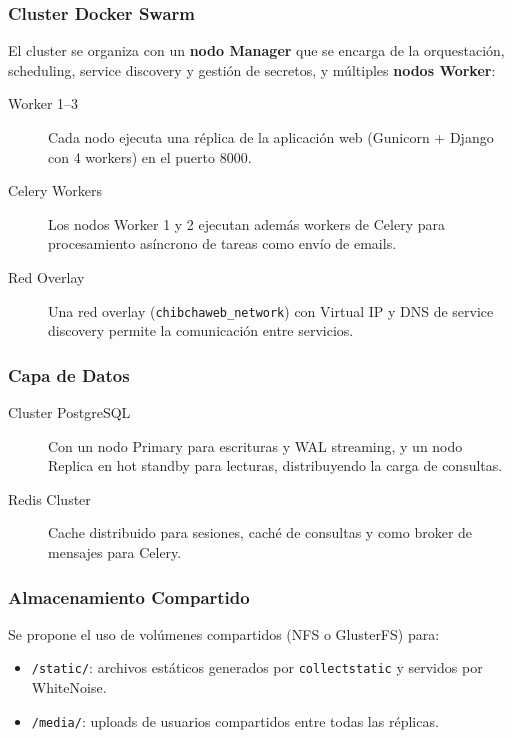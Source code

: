 \documentclass[12pt, a4paper]{article}
\begin{document}
\subsubsection{Cluster Docker Swarm}

El cluster se organiza con un \textbf{nodo Manager} que se encarga de la orquestación, scheduling, service discovery y gestión de secretos, y múltiples \textbf{nodos Worker}:

\begin{description}
    \item[Worker 1--3] Cada nodo ejecuta una réplica de la aplicación web (Gunicorn + Django con 4 workers) en el puerto 8000.
    \item[Celery Workers] Los nodos Worker 1 y 2 ejecutan además workers de Celery para procesamiento asíncrono de tareas como envío de emails.
    \item[Red Overlay] Una red overlay (\texttt{chibchaweb\_network}) con Virtual IP y DNS de service discovery permite la comunicación entre servicios.
\end{description}

\subsubsection{Capa de Datos}

\begin{description}
    \item[Cluster PostgreSQL] Con un nodo Primary para escrituras y WAL streaming, y un nodo Replica en hot standby para lecturas, distribuyendo la carga de consultas.
    \item[Redis Cluster] Cache distribuido para sesiones, caché de consultas y como broker de mensajes para Celery.
\end{description}

\subsubsection{Almacenamiento Compartido}

Se propone el uso de volúmenes compartidos (NFS o GlusterFS) para:
\begin{itemize}
    \item \texttt{/static/}: archivos estáticos generados por \texttt{collectstatic} y servidos por WhiteNoise.
    \item \texttt{/media/}: uploads de usuarios compartidos entre todas las réplicas.
\end{itemize}
\end{document}
